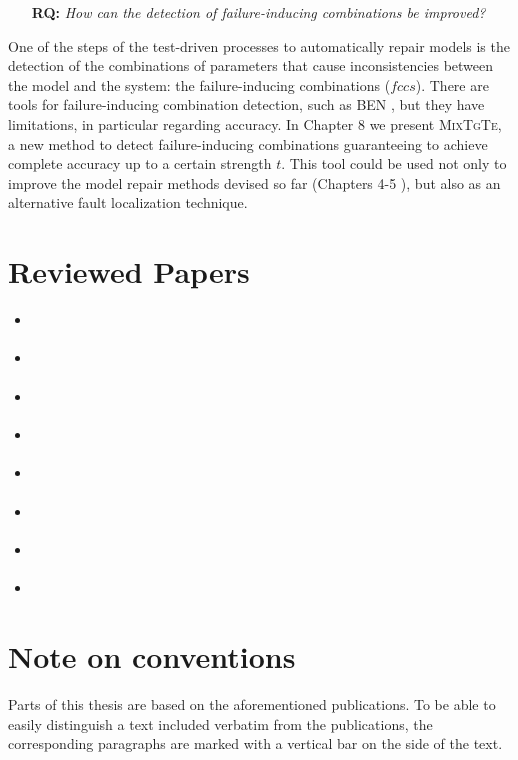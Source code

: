 \documentclass[
12pt, %
oneside, %
english, %
singlespacing, %
headsepline, %
consistentlayout, %
]{MastersDoctoralThesis} %
\newcommand{\fccs}{\ensuremath{\mathit{fccs}}\xspace}
\newcommand{\mix}{\textsc{MixTgTe}\xspace}
\newcounter{researchquestionCount}
\newcommand{\researchquestion}[1]{\stepcounter{researchquestionCount}\begin{itemize}\item [\textbf{RQ\arabic{researchquestionCount}:}] \emph{#1}\end{itemize}}
\theoremstyle{plain}
\theoremstyle{definition}
\theoremstyle{remark}
\theoremstyle{remark}
\theoremstyle{plain}
\theoremstyle{plain}
\theoremstyle{remark}
\begin{document}
\researchquestion{How can the detection of failure-inducing combinations be improved?}
One of the steps of the test-driven processes to automatically repair models is the detection of the combinations of parameters that cause inconsistencies between the model and the system: the failure-inducing combinations (\fccs).
There are tools for failure-inducing combination detection, such as BEN \cite{ben_2015} , but they have limitations, in particular regarding accuracy.
In Chapter 8 we present \mix, a new method to detect failure-inducing combinations guaranteeing to achieve complete accuracy up to a certain strength $t$.
This tool could be used not only to improve the model repair methods devised so far (Chapters 4-5 ), but also as an alternative fault localization technique.
	

\section{Reviewed Papers}
\begin{itemize}
	\item \cite{gargantini_combinatorial_2017} 
	
	\item \cite{arcaini2019achieving} 
	
	\item \cite{arcaini2018evolutionary} 
	
	\item \cite{IWCTGargantini2018} 
	
	\item \cite{Gargantini16:validation} 
	
	\item \cite{evolUpdateVAMOS2018} 
	
	\item \cite{arcaini2019efficient} 
	
	\item \cite{andre2019repairing} 
	
\end{itemize}

\section{Note on conventions}
Parts of this thesis are based on the aforementioned publications. To be able to easily distinguish a text included verbatim from the publications, the corresponding paragraphs are marked with a vertical bar on the side of the text.
\end{document}
